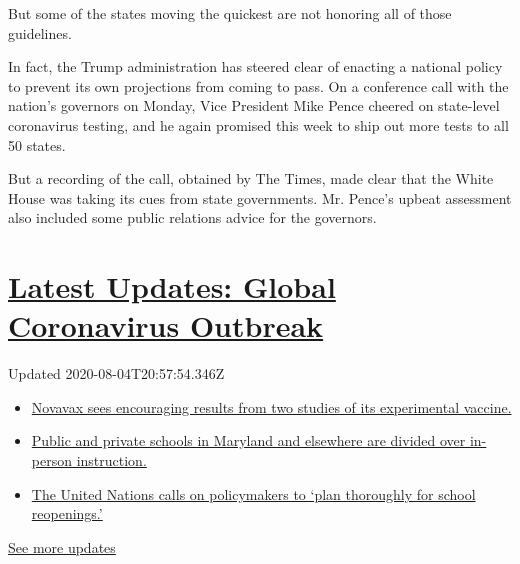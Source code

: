 But some of the states moving the quickest are not honoring all of those
guidelines.

In fact, the Trump administration has steered clear of enacting a
national policy to prevent its own projections from coming to pass. On a
conference call with the nation's governors on Monday, Vice President
Mike Pence cheered on state-level coronavirus testing, and he again
promised this week to ship out more tests to all 50 states.

But a recording of the call, obtained by The Times, made clear that the
White House was taking its cues from state governments. Mr. Pence's
upbeat assessment also included some public relations advice for the
governors.

\hypertarget{latest-updates-global-coronavirus-outbreak}{%
\section{\texorpdfstring{\href{https://www.nytimes.com/2020/08/04/world/coronavirus-cases.html?action=click\&pgtype=Article\&state=default\&region=MAIN_CONTENT_1\&context=storylines_live_updates}{Latest
Updates: Global Coronavirus
Outbreak}}{Latest Updates: Global Coronavirus Outbreak}}\label{latest-updates-global-coronavirus-outbreak}}

Updated 2020-08-04T20:57:54.346Z

\begin{itemize}
\tightlist
\item
  \href{https://www.nytimes.com/2020/08/04/world/coronavirus-cases.html?action=click\&pgtype=Article\&state=default\&region=MAIN_CONTENT_1\&context=storylines_live_updates\#link-1228a480}{Novavax
  sees encouraging results from two studies of its experimental
  vaccine.}
\item
  \href{https://www.nytimes.com/2020/08/04/world/coronavirus-cases.html?action=click\&pgtype=Article\&state=default\&region=MAIN_CONTENT_1\&context=storylines_live_updates\#link-4825b93}{Public
  and private schools in Maryland and elsewhere are divided over
  in-person instruction.}
\item
  \href{https://www.nytimes.com/2020/08/04/world/coronavirus-cases.html?action=click\&pgtype=Article\&state=default\&region=MAIN_CONTENT_1\&context=storylines_live_updates\#link-50f7386d}{The
  United Nations calls on policymakers to `plan thoroughly for school
  reopenings.'}
\end{itemize}

\href{https://www.nytimes.com/2020/08/04/world/coronavirus-cases.html?action=click\&pgtype=Article\&state=default\&region=MAIN_CONTENT_1\&context=storylines_live_updates}{See
more updates}

